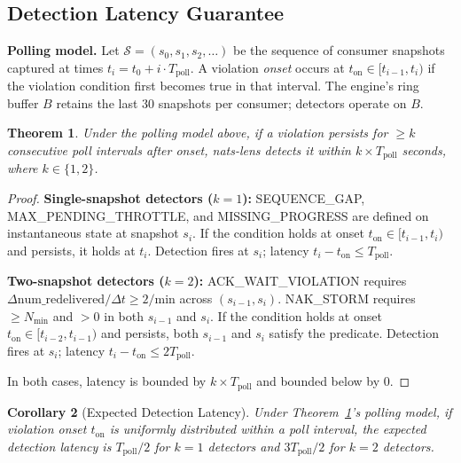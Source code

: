 \documentclass[journal]{IEEEtran}
\newtheorem{theorem}{Theorem}
\newtheorem{corollary}[theorem]{Corollary}
\begin{document}
\subsection{Detection Latency Guarantee}
\label{sec:guarantee}

\textbf{Polling model.} Let $\mathcal{S} = (s_0, s_1, s_2, \ldots)$ be
the sequence of consumer snapshots captured at times
$t_i = t_0 + i \cdot T_\text{poll}$. A violation \emph{onset} occurs at
$t_\text{on} \in [t_{i-1}, t_i)$ if the violation condition first becomes
true in that interval. The engine's ring buffer $B$ retains the last 30
snapshots per consumer; detectors operate on $B$.

\begin{theorem}
\label{thm:guarantee}
Under the polling model above, if a violation persists for $\geq k$
consecutive poll intervals after onset, nats-lens detects it within
$k \times T_\mathrm{poll}$ seconds, where $k \in \{1, 2\}$.
\end{theorem}

\begin{proof}
\textbf{Single-snapshot detectors ($k=1$):} SEQUENCE\_GAP,
MAX\_PENDING\_THROTTLE, and MISSING\_PROGRESS are defined on instantaneous
state at snapshot $s_i$. If the condition holds at onset
$t_\text{on} \in [t_{i-1}, t_i)$ and persists, it holds at $t_i$.
Detection fires at $s_i$; latency $t_i - t_\text{on} \leq T_\text{poll}$.

\textbf{Two-snapshot detectors ($k=2$):}
ACK\_WAIT\_VIOLATION requires $\Delta\text{num\_redelivered}/\Delta t
\geq 2/\text{min}$ across $(s_{i-1}, s_i)$.
NAK\_STORM requires  $\geq N_\text{min}$ and
 $> 0$ in both $s_{i-1}$ and $s_i$.
If the condition holds at onset $t_\text{on} \in [t_{i-2}, t_{i-1})$
and persists, both $s_{i-1}$ and $s_i$ satisfy the predicate.
Detection fires at $s_i$; latency $t_i - t_\text{on} \leq 2T_\text{poll}$.

In both cases, latency is bounded by $k \times T_\text{poll}$ and
bounded below by 0.
\end{proof}

\begin{corollary}[Expected Detection Latency]
\label{cor:expected}
Under Theorem~\ref{thm:guarantee}'s polling model, if violation onset
$t_\text{on}$ is uniformly distributed within a poll interval, the
expected detection latency is $T_\text{poll}/2$ for $k{=}1$ detectors
and $3T_\text{poll}/2$ for $k{=}2$ detectors.
\end{corollary}
\end{document}
